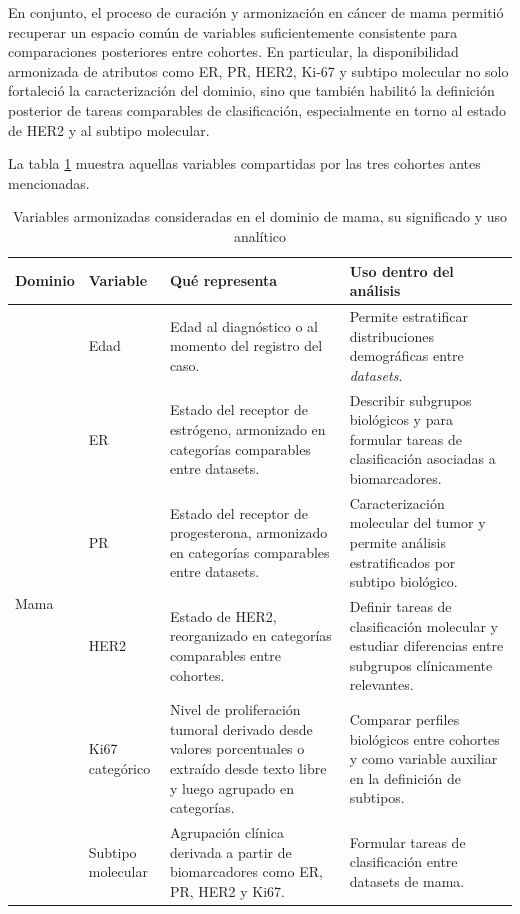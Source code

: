 En conjunto, el proceso de curación y armonización en cáncer de mama permitió recuperar un espacio común de variables suficientemente consistente para comparaciones posteriores entre cohortes. En particular, la disponibilidad armonizada de atributos como ER, PR, HER2, Ki-67 y subtipo molecular no solo fortaleció la caracterización del dominio, sino que también habilitó la definición posterior de tareas comparables de clasificación, especialmente en torno al estado de HER2 y al subtipo molecular.

La tabla \ref{tab:variables_armonizadas_significado} muestra aquellas variables compartidas por las tres cohortes antes mencionadas.

\begin{table}[H]
\centering
\caption{Variables armonizadas consideradas en el dominio de mama, su significado y uso analítico}
\label{tab:variables_armonizadas_significado}
\begin{tabular}{p{2.2cm}p{2.8cm}p{5.0cm}p{4.8cm}}
\toprule
\textbf{Dominio} & \textbf{Variable} & \textbf{Qué representa} & \textbf{Uso dentro del análisis} \\
\midrule

\multirow{7}{*}{Mama}
& Edad & Edad al diagnóstico o al momento del registro del caso. & Permite estratificar distribuciones demográficas entre \textit{datasets}. \\
& ER & Estado del receptor de estrógeno, armonizado en categorías comparables entre datasets. & Describir subgrupos biológicos y para formular tareas de clasificación asociadas a biomarcadores. \\
& PR & Estado del receptor de progesterona, armonizado en categorías comparables entre datasets. & Caracterización molecular del tumor y permite análisis estratificados por subtipo biológico. \\
& HER2 & Estado de HER2, reorganizado en categorías comparables entre cohortes. & Definir tareas de clasificación molecular y estudiar diferencias entre subgrupos clínicamente relevantes. \\
& Ki67 categórico & Nivel de proliferación tumoral derivado desde valores porcentuales o extraído desde texto libre y luego agrupado en categorías. & Comparar perfiles biológicos entre cohortes y como variable auxiliar en la definición de subtipos. \\
& Subtipo molecular & Agrupación clínica derivada a partir de biomarcadores como ER, PR, HER2 y Ki67. & Formular tareas de clasificación entre datasets de mama. \\
\bottomrule
\end{tabular}
\end{table}

